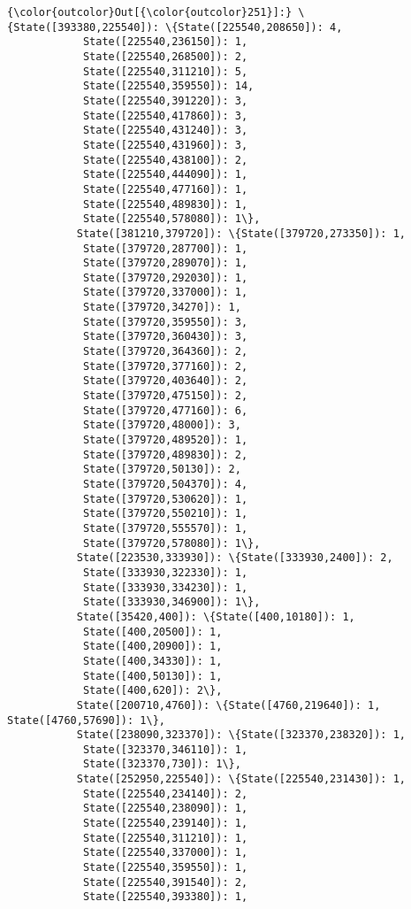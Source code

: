 \documentclass[11pt]{article}
\begin{document}
\begin{Verbatim}[commandchars=\\\{\}]
{\color{outcolor}Out[{\color{outcolor}251}]:} \{State([393380,225540]): \{State([225540,208650]): 4,
            State([225540,236150]): 1,
            State([225540,268500]): 2,
            State([225540,311210]): 5,
            State([225540,359550]): 14,
            State([225540,391220]): 3,
            State([225540,417860]): 3,
            State([225540,431240]): 3,
            State([225540,431960]): 3,
            State([225540,438100]): 2,
            State([225540,444090]): 1,
            State([225540,477160]): 1,
            State([225540,489830]): 1,
            State([225540,578080]): 1\},
           State([381210,379720]): \{State([379720,273350]): 1,
            State([379720,287700]): 1,
            State([379720,289070]): 1,
            State([379720,292030]): 1,
            State([379720,337000]): 1,
            State([379720,34270]): 1,
            State([379720,359550]): 3,
            State([379720,360430]): 3,
            State([379720,364360]): 2,
            State([379720,377160]): 2,
            State([379720,403640]): 2,
            State([379720,475150]): 2,
            State([379720,477160]): 6,
            State([379720,48000]): 3,
            State([379720,489520]): 1,
            State([379720,489830]): 2,
            State([379720,50130]): 2,
            State([379720,504370]): 4,
            State([379720,530620]): 1,
            State([379720,550210]): 1,
            State([379720,555570]): 1,
            State([379720,578080]): 1\},
           State([223530,333930]): \{State([333930,2400]): 2,
            State([333930,322330]): 1,
            State([333930,334230]): 1,
            State([333930,346900]): 1\},
           State([35420,400]): \{State([400,10180]): 1,
            State([400,20500]): 1,
            State([400,20900]): 1,
            State([400,34330]): 1,
            State([400,50130]): 1,
            State([400,620]): 2\},
           State([200710,4760]): \{State([4760,219640]): 1, State([4760,57690]): 1\},
           State([238090,323370]): \{State([323370,238320]): 1,
            State([323370,346110]): 1,
            State([323370,730]): 1\},
           State([252950,225540]): \{State([225540,231430]): 1,
            State([225540,234140]): 2,
            State([225540,238090]): 1,
            State([225540,239140]): 1,
            State([225540,311210]): 1,
            State([225540,337000]): 1,
            State([225540,359550]): 1,
            State([225540,391540]): 2,
            State([225540,393380]): 1,

\end{Verbatim}
\end{document}
